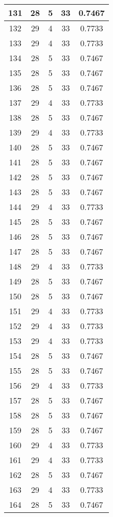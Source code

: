 \documentclass[letterpaper, 12pt]{article}
\begin{document}
\begin{longtable}{|c|c|c|c|c|}
\hline
131 & 28 & 5 & 33 & 0.7467 \\
\hline
132 & 29 & 4 & 33 & 0.7733 \\
\hline
133 & 29 & 4 & 33 & 0.7733 \\
\hline
134 & 28 & 5 & 33 & 0.7467 \\
\hline
135 & 28 & 5 & 33 & 0.7467 \\
\hline
136 & 28 & 5 & 33 & 0.7467 \\
\hline
137 & 29 & 4 & 33 & 0.7733 \\
\hline
138 & 28 & 5 & 33 & 0.7467 \\
\hline
139 & 29 & 4 & 33 & 0.7733 \\
\hline
140 & 28 & 5 & 33 & 0.7467 \\
\hline
141 & 28 & 5 & 33 & 0.7467 \\
\hline
142 & 28 & 5 & 33 & 0.7467 \\
\hline
143 & 28 & 5 & 33 & 0.7467 \\
\hline
144 & 29 & 4 & 33 & 0.7733 \\
\hline
145 & 28 & 5 & 33 & 0.7467 \\
\hline
146 & 28 & 5 & 33 & 0.7467 \\
\hline
147 & 28 & 5 & 33 & 0.7467 \\
\hline
148 & 29 & 4 & 33 & 0.7733 \\
\hline
149 & 28 & 5 & 33 & 0.7467 \\
\hline
150 & 28 & 5 & 33 & 0.7467 \\
\hline
151 & 29 & 4 & 33 & 0.7733 \\
\hline
152 & 29 & 4 & 33 & 0.7733 \\
\hline
153 & 29 & 4 & 33 & 0.7733 \\
\hline
154 & 28 & 5 & 33 & 0.7467 \\
\hline
155 & 28 & 5 & 33 & 0.7467 \\
\hline
156 & 29 & 4 & 33 & 0.7733 \\
\hline
157 & 28 & 5 & 33 & 0.7467 \\
\hline
158 & 28 & 5 & 33 & 0.7467 \\
\hline
159 & 28 & 5 & 33 & 0.7467 \\
\hline
160 & 29 & 4 & 33 & 0.7733 \\
\hline
161 & 29 & 4 & 33 & 0.7733 \\
\hline
162 & 28 & 5 & 33 & 0.7467 \\
\hline
163 & 29 & 4 & 33 & 0.7733 \\
\hline
164 & 28 & 5 & 33 & 0.7467 \\

\end{longtable}
\end{document}
